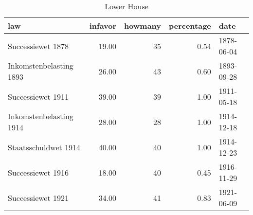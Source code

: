 \begin{table}[ht]
\centering
\begin{tabular}{lrrrl}
  \hline
law & infavor & howmany & percentage & date \\ 
  \hline
Successiewet 1878 & 19.00 &  35 & 0.54 & 1878-06-04 \\ 
  Inkomstenbelasting 1893 & 26.00 &  43 & 0.60 & 1893-09-28 \\ 
  Successiewet 1911 & 39.00 &  39 & 1.00 & 1911-05-18 \\ 
  Inkomstenbelasting 1914 & 28.00 &  28 & 1.00 & 1914-12-18 \\ 
  Staatsschuldwet 1914 & 40.00 &  40 & 1.00 & 1914-12-23 \\ 
  Successiewet 1916 & 18.00 &  40 & 0.45 & 1916-11-29 \\ 
  Successiewet 1921 & 34.00 &  41 & 0.83 & 1921-06-09 \\ 
   \hline
\end{tabular}
\caption{Lower House} 
\end{table}
